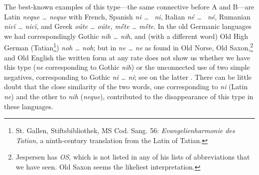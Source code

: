  \label{sec:type1}
The best-known examples of this type---the same connective before A and B---are Latin \textit{neque {\dots} neque} with 
French, 
Spanish \textit{ni \dots~ ni}, 
Italian \textit{né \dots~ né}, Rumanian \textit{nicĭ {\dots} nicĭ}, %
and Greek \textit{oúte {\dots} oúte, m{\'ē}te {\dots} m{\'ē}te}. In the old Germanic languages we had correspondingly Gothic \textit{nih {\dots} nih}, and (with a different word) Old High German (Tatian\footnote{St. Gallen, Stiftsbibliothek, MS Cod. Sang. 56: \textit{Evangelienharmonie des Tatian}, a ninth-century translation from the Latin of Tatian. \eds}) %
\textit{noh {\dots} noh}; but in 
\textit{ne {\dots} ne} as found in Old Norse, Old Saxon,\footnote{Jespersen has \textit{OS}, which is not listed in any of his lists of abbreviations that we have seen. Old Saxon seems the likeliest interpretation. \eds}
and Old English the written form at any rate does not show us whether we have this type (\textit{ne} corresponding to Gothic \textit{nih}) or the unconnected use of two simple negatives, corresponding to Gothic \textit{ni {\dots} ni}; see on the latter \citet[\href{http://www.jstor.org/stable/40846532}{11ff}]{neckel1912germanischen}. There can be little doubt that the close similarity of the two words, one corresponding to \textit{ni} (Latin \textit{ne}) and the other to \textit{nih} (\textit{neque}), contributed to the disappearance of this type in these languages.

